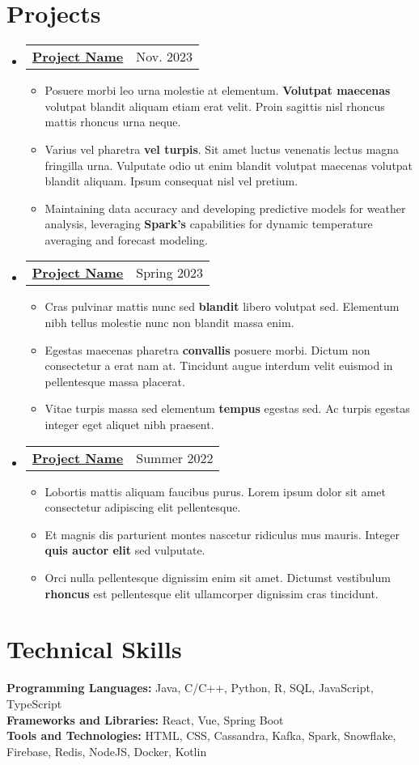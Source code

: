 \documentclass[letterpaper,11pt]{article}
\makeatletter
\newcommand{\resumeItem}[1] {
  \item\small{
    {#1 \vspace{-4pt}}
  }
}
\newcommand{\resumeSubHeadingListStart} {
  \begin{itemize}[leftmargin=0.0in, label={}]
}
\newcommand{\resumeSubHeadingListEnd} {
  \end{itemize}
  \vspace{-10pt}
}
\newcommand{\resumeProjectHeading}[2] {
  \vspace{-2pt}\item
  \begin{tabular*} {1.0\textwidth}{l@{\extracolsep{\fill}}r}
    \small{#1} & \small{#2}\\
  \end{tabular*}
  \vspace{-8pt}
}
\newcommand{\resumeItemListEnd} {
  \end{itemize}
  \vspace{-8pt}
}
\newcommand{\resumeProjectItemListStart} {
  \begin{itemize}
  \vspace{-15pt}
}
\makeatother
\begin{document}
  \section{Projects}
    \resumeSubHeadingListStart
      \resumeProjectHeading
        {\textbf{\href{https://GitHubRepoLink.com/} {Project Name}}} {Nov. 2023}
        \resumeProjectItemListStart
          \resumeItem{Posuere morbi leo urna molestie at elementum. \textbf{Volutpat maecenas} volutpat blandit aliquam etiam erat velit. Proin sagittis nisl rhoncus mattis rhoncus urna neque.}
          \resumeItem{Varius vel pharetra \textbf{vel turpis}. Sit amet luctus venenatis lectus magna fringilla urna. Vulputate odio ut enim blandit volutpat maecenas volutpat blandit aliquam. Ipsum consequat nisl vel pretium.}
          \resumeItem{Maintaining data accuracy and developing predictive models for weather analysis, leveraging \textbf{Spark's} capabilities for dynamic temperature averaging and forecast modeling.}
        \resumeItemListEnd
            
      \resumeProjectHeading
        {\textbf{\href{https://GitHubRepoLink.com/} {Project Name}}} {Spring 2023}
        \resumeProjectItemListStart
          \resumeItem{Cras pulvinar mattis nunc sed \textbf{blandit} libero volutpat sed. Elementum nibh tellus molestie nunc non blandit massa enim.}
          \resumeItem{Egestas maecenas pharetra \textbf{convallis} posuere morbi. Dictum non consectetur a erat nam at. Tincidunt augue interdum velit euismod in pellentesque massa placerat.}
          \resumeItem{Vitae turpis massa sed elementum \textbf{tempus} egestas sed. Ac turpis egestas integer eget aliquet nibh praesent.}
        \resumeItemListEnd 
          
      \resumeProjectHeading
      {\textbf{\href{https://GitHubRepoLink.com/} {Project Name}}} {Summer 2022}
      \resumeProjectItemListStart
        \resumeItem{Lobortis mattis aliquam faucibus purus. Lorem ipsum dolor sit amet consectetur adipiscing elit pellentesque.}
        \resumeItem{Et magnis dis parturient montes nascetur ridiculus mus mauris. Integer \textbf{quis auctor elit} sed vulputate.}
        \resumeItem{Orci nulla pellentesque dignissim enim sit amet. Dictumst vestibulum \textbf{rhoncus} est pellentesque elit ullamcorper dignissim cras tincidunt.}
      \resumeItemListEnd
    \resumeSubHeadingListEnd
  \vspace{-5pt}
  
  \section{Technical Skills}
    \begin{itemize}[leftmargin=0.00in, label={}]
        \small{\item{
          \textbf{Programming Languages:} {Java, C/C++, Python, R, SQL, JavaScript, TypeScript} \\
          \textbf{Frameworks and Libraries:} {React, Vue, Spring Boot} \\
          \textbf{Tools and Technologies:} {HTML, CSS, Cassandra, Kafka, Spark, Snowflake, Firebase, Redis, NodeJS, Docker, Kotlin} \\
        }}
    \end{itemize}
\end{document}
